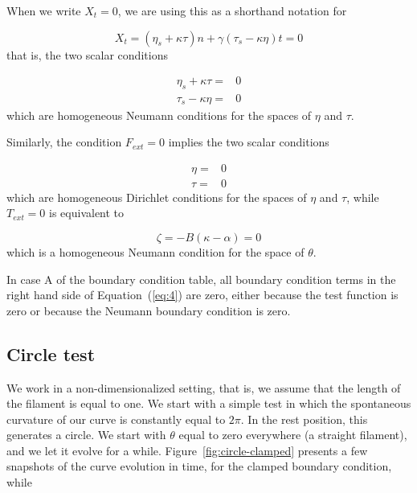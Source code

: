 \documentclass[12pt]{article}
\begin{document}
When we write \(X_t = 0\), we are using this as a shorthand notation for

\[X_t =  (\eta_s + \kappa \tau) n + \gamma(\tau_s - \kappa \eta) t = 0\]
%
that is, the two scalar conditions

\[\begin{aligned}
\eta_s + \kappa \tau = &0 \\
\tau_s - \kappa \eta = &0
\end{aligned}\]
%
which are homogeneous Neumann conditions for the spaces of $\eta$ and $\tau$.

Similarly, the condition \(F_{ext} = 0\) implies the two scalar
conditions

\[\begin{aligned}
\eta = &0 \\
\tau = &0
\end{aligned}\]
%
which are homogeneous Dirichlet conditions for the spaces of $\eta$
and $\tau$, while \(T_{ext} = 0\) is equivalent to

\[\zeta = -B(\kappa-\alpha) = 0\]
%
which is a homogeneous Neumann condition for the space of $\theta$. 

In case A of the boundary condition table, all boundary condition
terms in the right hand side of Equation~(\ref{eq:4}) are zero, either
because the test function is zero or because the Neumann boundary
condition is zero. 

\subsection{Circle test}\label{circle-test}

We work in a non-dimensionalized setting, that is, we assume that the
length of the filament is equal to one. We start with a simple test in
which the spontaneous curvature of our curve is constantly equal to
$2\pi$. In the rest position, this generates a circle. We start with
$\theta$ equal to zero everywhere (a straight filament), and we let it
evolve for a while. Figure~\ref{fig:circle-clamped} presents a few
snapshots of the curve evolution in time, for the clamped boundary
condition, while
\end{document}
